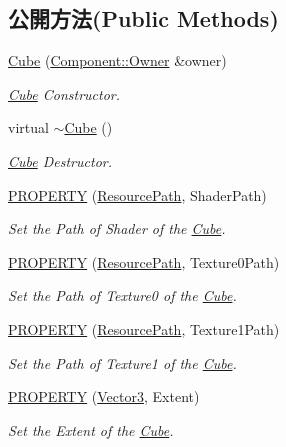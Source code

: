 \subsection*{公開方法(Public Methods)}
\begin{DoxyCompactItemize}
\item 
\hyperlink{class_i_dream_sky_1_1_cube_a22ed9e5edafea9f5c96af56ce6dff146}{Cube} (\hyperlink{class_i_dream_sky_1_1_component_1_1_owner}{Component\+::\+Owner} \&owner)
\begin{DoxyCompactList}\small\item\em \hyperlink{class_i_dream_sky_1_1_cube}{Cube} Constructor. \end{DoxyCompactList}\item 
virtual \hyperlink{class_i_dream_sky_1_1_cube_aa814e979cecb8c451fdb332ded2cea1e}{$\sim$\+Cube} ()
\begin{DoxyCompactList}\small\item\em \hyperlink{class_i_dream_sky_1_1_cube}{Cube} Destructor. \end{DoxyCompactList}\item 
\hyperlink{class_i_dream_sky_1_1_cube_a0c639cb71adceafa575934622b943e3c}{P\+R\+O\+P\+E\+R\+TY} (\hyperlink{class_i_dream_sky_1_1_resource_path}{Resource\+Path}, Shader\+Path)
\begin{DoxyCompactList}\small\item\em Set the Path of Shader of the \hyperlink{class_i_dream_sky_1_1_cube}{Cube}. \end{DoxyCompactList}\item 
\hyperlink{class_i_dream_sky_1_1_cube_a55c7bc2687f8f5c3692df365d6d5e1b3}{P\+R\+O\+P\+E\+R\+TY} (\hyperlink{class_i_dream_sky_1_1_resource_path}{Resource\+Path}, Texture0\+Path)
\begin{DoxyCompactList}\small\item\em Set the Path of Texture0 of the \hyperlink{class_i_dream_sky_1_1_cube}{Cube}. \end{DoxyCompactList}\item 
\hyperlink{class_i_dream_sky_1_1_cube_af13fafeda0ce05057bd1fc15a2d8dacb}{P\+R\+O\+P\+E\+R\+TY} (\hyperlink{class_i_dream_sky_1_1_resource_path}{Resource\+Path}, Texture1\+Path)
\begin{DoxyCompactList}\small\item\em Set the Path of Texture1 of the \hyperlink{class_i_dream_sky_1_1_cube}{Cube}. \end{DoxyCompactList}\item 
\hyperlink{class_i_dream_sky_1_1_cube_a80e8af868125563c65951cba8285a6ce}{P\+R\+O\+P\+E\+R\+TY} (\hyperlink{class_i_dream_sky_1_1_vector3}{Vector3}, Extent)
\begin{DoxyCompactList}\small\item\em Set the Extent of the \hyperlink{class_i_dream_sky_1_1_cube}{Cube}. \end{DoxyCompactList}\end{DoxyCompactItemize}
